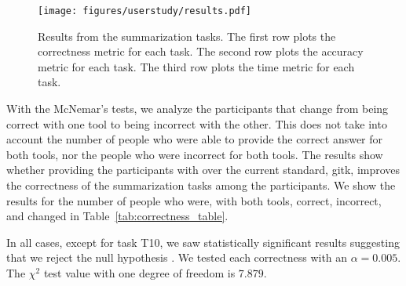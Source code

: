 \begin{figure}[htpb]
  \centering
  \texttt{[image: figures/userstudy/results.pdf]}
  \caption{Results from the summarization tasks. The first row plots the
    correctness metric for each task. The second row plots the
    accuracy metric for each task. The third row plots the time metric
    for each task.}
  \label{fig:summarization_results}
\end{figure}


With the McNemar's tests, we analyze the participants that change from
being correct with one tool to being incorrect with the other.  This does
not take into account the number of people who were able to provide the
correct answer for both tools, nor the people who were incorrect for both
tools.  The results show whether providing the participants with \tool
over the current standard, gitk, improves the correctness of the
summarization tasks among the participants.  We show the results for the
number of people who were, with both tools, correct, incorrect, and
changed in Table~\ref{tab:correctness_table}.

In all cases, except for task T10,  we saw statistically significant
results  suggesting that we reject the null hypothesis .  We tested each
correctness with an $\alpha = 0.005$. The $\chi^2$ test value with one
degree of freedom is $7.879$.

